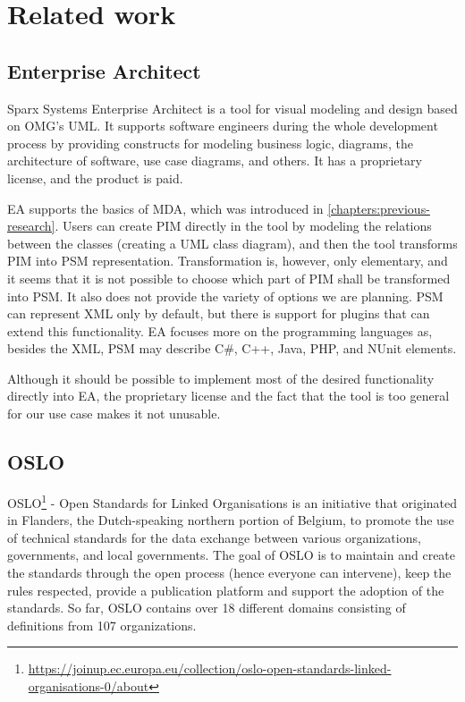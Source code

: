 \chapter{Related work}
\label{chapters:related-work}

\section{Enterprise Architect}

Sparx Systems Enterprise Architect is a tool for visual modeling and design based on OMG's UML. It supports software engineers during the whole development process by providing constructs for modeling business logic, diagrams, the architecture of software, use case diagrams, and others. It has a proprietary license, and the product is paid.

EA supports the basics of MDA, which was introduced in \autoref{chapters:previous-research}. Users can create PIM directly in the tool by modeling the relations between the classes (creating a UML class diagram), and then the tool transforms PIM into PSM representation. Transformation is, however, only elementary, and it seems that it is not possible to choose which part of PIM shall be transformed into PSM. It also does not provide the variety of options we are planning. PSM can represent XML only by default, but there is support for plugins that can extend this functionality. EA focuses more on the programming languages as, besides the XML, PSM may describe C\#, C++, Java, PHP, and NUnit elements.

Although it should be possible to implement most of the desired functionality directly into EA, the proprietary license and the fact that the tool is too general for our use case makes it not unusable.

\section{OSLO}

OSLO\footnote{\url{https://joinup.ec.europa.eu/collection/oslo-open-standards-linked-organisations-0/about}} - Open Standards for Linked Organisations is an initiative that originated in Flanders, the Dutch-speaking northern portion of Belgium, to promote the use of technical standards for the data exchange between various organizations, governments, and local governments. The goal of OSLO is to maintain and create the standards through the open process (hence everyone can intervene), keep the rules respected, provide a publication platform and support the adoption of the standards. So far, OSLO contains over 18 different domains consisting of definitions from 107 organizations.

